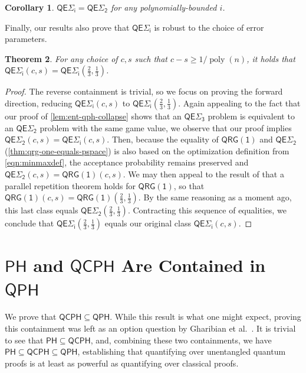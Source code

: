 \documentclass[10pt,a4paper]{article}
\newtheorem{theorem}{Theorem}[section]
\newtheorem{corollary}[theorem]{Corollary}
\theoremstyle{definition}
\DeclareMathOperator{\poly}{poly}
\newcommand{\class}[1]{\ensuremath{\mathsf{#1}}\xspace}
\newcommand{\QRGk}[1][k]{\class{QRG(#1)}}
\newcommand{\QRGone}{\QRGk[1]}
\newcommand{\PH}{\class{PH}}
\newcommand{\QCPH}{\class{QCPH}}
\newcommand{\QPH}{\class{QPH}}
\newcommand{\entQSigmai}[1][i]{\class{QE\Sigma_{#1}}}
\begin{document}
\begin{corollary}\label{corr:entQSigmaPoly=2}
    $\entQSigmai[i] = \entQSigmai[2]$ for any polynomially-bounded $i$.
\end{corollary}

Finally, our results also prove that $\entQSigmai$ is robust to the choice of error parameters.

\begin{theorem}\label{thm:entqsigmaerror}
    For any choice of $c,s$ such that $c-s\geq 1/\poly(n)$, it holds that $\entQSigmai[i]\left(c,s\right) = \entQSigmai[i]\left(\tfrac{2}{3},\tfrac{1}{3}\right)$.
\end{theorem}
\begin{proof}
    The reverse containment is trivial, so we focus on proving the forward direction, reducing $\entQSigmai[i]\left(c,s\right)$ to $ \entQSigmai[i]\left(\tfrac{2}{3},\tfrac{1}{3}\right)$.
    Again appealing to the fact that our proof of \cref{lem:ent-qph-collapse} shows that an $\entQSigmai[3]$ problem is equivalent to an $\entQSigmai[2]$ problem with the same game value, we observe that our proof implies $\entQSigmai[2](c,s)=\entQSigmai[i](c,s)$.
    Then, because the equality of $\QRGone$ and $\entQSigmai[2]$
    (\cref{thm:qrg-one-equals-pspace}) is also based on the optimization definition from \cref{eqn:minmaxdef}, the acceptance probability remains preserved and $\entQSigmai[2](c,s)=\QRGone(c,s)$. We may then appeal to the result of \cite{gutoski2005qrg} that a parallel repetition theorem holds for $\QRGone$, so that $\QRGone(c,s)=\QRGone\left(\tfrac{2}{3},\tfrac{1}{3}\right)$.
    By the same reasoning as a moment ago, this last class equals $\entQSigmai[2]\left(\tfrac{2}{3},\tfrac{1}{3}\right)$.
    Contracting this sequence of equalities, we conclude that $\entQSigmai[i]\left(\tfrac{2}{3},\tfrac{1}{3}\right)$ equals our original class $\entQSigmai[i](c,s)$.
\end{proof}




\section{\texorpdfstring{$\PH$ and $\QCPH$ Are Contained in $\QPH$}{PH and QCPH Are Contained in prodQPH}}\label{sec:direct-proof-ph-prodqph}

We prove that $\QCPH \subseteq \QPH$. 
While this result is what one might expect, proving this containment was left as an option question by Gharibian et al.\ \cite{GSSSY22_qph}.
It is trivial to see that $\PH \subseteq \QCPH$, and, combining these two containments, we have $\PH \subseteq \QCPH \subseteq \QPH$, establishing that quantifying over unentangled quantum proofs is at least as powerful as quantifying over classical proofs. 
\end{document}
